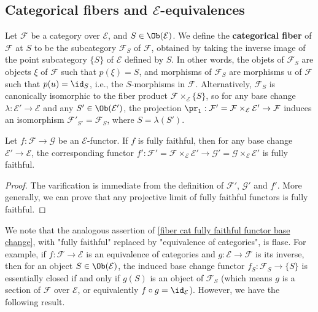 \subsection{Categorical fibers and \texorpdfstring{$\mathcal{E}$}{E}-equivalences}
Let $\mathcal{F}$ be a category over $\mathcal{E}$, and $S\in\Ob(\mathcal{E})$. We define the \textbf{categorical fiber} of $\mathcal{F}$ at $S$ to be the subcategory $\mathcal{F}_S$ of $\mathcal{F}$, obtained by taking the inverse image of the point subcategory $\{S\}$ of $\mathcal{E}$ defined by $S$. In other words, the objets of $\mathcal{F}_S$ are objects $\xi$ of $\mathcal{F}$ such that $p(\xi)=S$, and morphisms of $\mathcal{F}_S$ are morphisms $u$ of $\mathcal{F}$ such that $p(u)=\id_S$, i.e., the $S$-morphisms in $\mathcal{F}$. Alternatively, $\mathcal{F}_S$ is canonically isomorphic to the fiber product $\mathcal{F}\times_\mathcal{E}\{S\}$, so for any base change $\lambda:\mathcal{E}'\to \mathcal{E}$ and any $S'\in\Ob(\mathcal{E}')$, the projection $\pr_1:\mathcal{F}'=\mathcal{F}\times_\mathcal{E}\mathcal{E}'\to \mathcal{F}$ induces an isomorphism $\mathcal{F}'_{S'}=\mathcal{F}_S$, where $S=\lambda(S')$.
\begin{proposition}\label{fiber cat fully faithful functor base change}
Let $f:\mathcal{F}\to \mathcal{G}$ be an $\mathcal{E}$-functor. If $f$ is fully faithful, then for any base change $\mathcal{E}'\to \mathcal{E}$, the corresponding functor $f':\mathcal{F}'=\mathcal{F}\times_\mathcal{E}\mathcal{E}'\to \mathcal{G}'=\mathcal{G}\times_\mathcal{E}\mathcal{E}'$ is fully faithful.
\end{proposition}
\begin{proof}
The varification is immediate from the definition of $\mathcal{F}'$, $\mathcal{G}'$ and $f'$. More generally, we can prove that any projective limit of fully faithful functors is fully faithful.
\end{proof}
We note that the analogous assertion of \cref{fiber cat fully faithful functor base change}, with "fully faithful" replaced by "equivalence of categories", is flase. For example, if $f:\mathcal{F}\to \mathcal{E}$ is an equivalence of categories and $g:\mathcal{E}\to \mathcal{F}$ is its inverse, then for an object $S\in\Ob(\mathcal{E})$, the induced base change functor $f_S:\mathcal{F}_S\to \{S\}$ is essentially closed if and only if $g(S)$ is an object of $\mathcal{F}_S$ (which means $g$ is a section of $\mathcal{F}$ over $\mathcal{E}$, or equivalently $f\circ g=\id_\mathcal{E}$). However, we have the following result.
